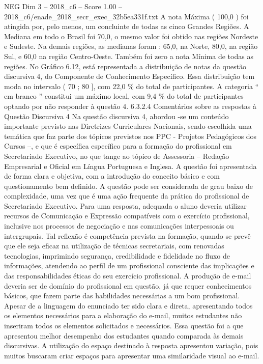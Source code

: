 \begin{textsample}{NEG Dim 3 – 2018\_c6 – Score 1.00 – 2018\_c6/enade\_2018\_secr\_exec\_32b5ea331f.txt}
A nota Máxima ( 100,0 ) foi atingida por, pelo menos, um concluinte de todas as cinco Grandes Regiões.
A Mediana em todo o Brasil foi 70,0, o mesmo valor foi obtido nas regiões Nordeste e Sudeste.
Na demais regiões, as medianas foram : 65,0, na Norte, 80,0, na região Sul, e 60,0 na região Centro-Oeste.
Também foi zero a nota Mínima de todas as regiões.
No Gráfico 6.12, está representada a distribuição de notas da questão discursiva 4, do Componente de Conhecimento Específico.
Essa distribuição tem moda no intervalo ( 70 ; 80 ], com 22,0 \% do total de participantes.
A categoria “ em branco ” constitui um máximo local, com 9,4 \% do total de participantes optando por não responder à questão 4. 6.3.2.4 Comentários sobre as respostas à Questão Discursiva 4 Na questão discursiva 4, abordou -se um conteúdo importante previsto nas Diretrizes Curriculares Nacionais, sendo escolhida uma temática que faz parte dos tópicos previstos nos PPC - Projetos Pedagógicos dos Cursos –, e que é específica específico para a formação do profissional em Secretariado Executivo, no que tange ao tópico de Assessoria – Redação Empresarial e Oficial em Língua Portuguesa e Inglesa.
A questão foi apresentada de forma clara e objetiva, com a introdução do conceito básico e com questionamento bem definido.
A questão pode ser considerada de grau baixo de complexidade, uma vez que é uma ação frequente da prática do profissional de Secretariado Executivo.
Para uma resposta, adequada o aluno deveria utilizar recursos de Comunicação e Expressão compatíveis com o exercício profissional, inclusive nos processos de negociação e nas comunicações interpessoais ou intergrupais.
Tal reflexão é competência prevista na formação, quando se prevê que ele seja eficaz na utilização de técnicas secretariais, com renovadas tecnologias, imprimindo segurança, credibilidade e fidelidade no fluxo de informações, atendendo ao perfil de um profissional consciente das implicações e das responsabilidades éticas do seu exercício profissional.
A produção de e-mail deveria ser de domínio do profissional em questão, já que requer conhecimentos básicos, que fazem parte das habilidades necessárias a um bom profissional.
Apesar de a linguagem do enunciado ter sido clara e direta, apresentando todos os elementos necessários para a elaboração do e-mail, muitos estudantes não inseriram todos os elementos solicitados e necessários.
Essa questão foi a que apresentou melhor desempenho dos estudantes quando comparada às demais discursivas.
A utilização do espaço destinado à resposta apresentou variação, pois muitos buscaram criar espaços para apresentar uma similaridade visual ao e-mail.

\end{textsample}
